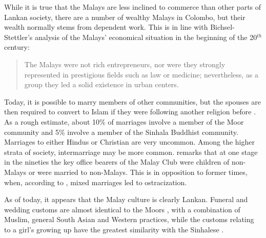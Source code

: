 While it is true that the Malays are less inclined to commerce than other parts of Lankan society, there are a number of wealthy Malays in Colombo, but their wealth normally stems from dependent work. This is in line with Bichsel-Stettler's analysis of the Malays' economical situation in the beginning of the 20$^{th}$ century:

\begin{quote}
The Malays were not rich entrepreneurs, nor were they strongly represented in prestigious fields such as law or medicine; nevertheless, as a group they led a solid existence in urban centers. \citep[27]{Bichsel}
\end{quote}

Today, it is possible to marry members of other communities, but the spouses are then required to convert to Islam if they were following another religion before \citep{LimEtAl2006aclcwp}. As a rough estimate, about 10\% of marriages involve a member of the Moor community and 5\% involve a member of the Sinhala Buddhist community. Marriages to either Hindus or Christian are very uncommon. Among the higher strata of society, intermarriage may be more common. \citet[83f]{Saldin2003} remarks that at one stage in the nineties the key office bearers of the Malay Club were children of non-Malays or  were married to non-Malays. This is in opposition to former times, when, according to \citet[64]{Saldin2003}, mixed marriages led to ostracization.

As of today, it appears that the Malay culture is clearly Lankan. Funeral and wedding customs are almost identical to the Moors \citep[1,79]{Saldin2003}, with a combination of Muslim, general South Asian and Western practices,  while the customs relating to a girl's growing up have the greatest similarity with the Sinhalese \citep[35]{Saldin2003}.










